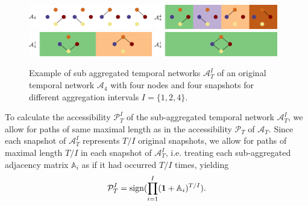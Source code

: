 \documentclass[%
 reprint,
 amsmath,amssymb,
 aps,
]{revtex4-2}
\begin{document}
\begin{figure}[]
\includegraphics[width=0.48\textwidth]{fig/I0.png}
\includegraphics[width=0.48\textwidth]{fig/I4.png}
\includegraphics[width=0.48\textwidth]{fig/I2.png}
\includegraphics[width=0.48\textwidth]{fig/I1.png}
\caption{\label{fig:EXsub}Example of sub aggregated temporal networks $\mathcal{A}^I_T$ of an original temporal network $\mathcal{A}_4$ with four nodes and four snapshots for different aggregation intervals $I=\{1,2,4\}$.
}
\end{figure}

To calculate the accessibility $\mathcal{P}_{T}^{I}$ of the sub-aggregated temporal network $\mathcal{A}^I_T$, we allow for paths of same maximal length as in the accessibility $\mathcal{P}_{T}$ of %
$\mathcal{A}_T$. Since each snapshot of $\mathcal{A}^I_T$ represents $T/I$ original snapshots, we allow for paths of maximal length $T/I$ in each snapshot of $\mathcal{A}^I_T$, i.e. treating each sub-aggregated adjacency matrix $\mathbb{A}_i$ as if it had occurred $T/I$ times, yielding
\begin{align} 
\mathcal{P}_{T}^{I} 
= \hbox{sign}(\prod_{i=1}^{I} (\mathbf{1} + \mathbb{A}_i)^{T/I}) .
\label{eq:PAI}
\end{align}
\end{document}
